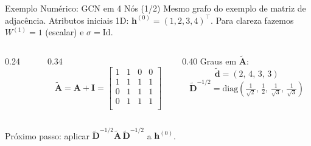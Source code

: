 \documentclass[aspectratio=169,xcolor=dvipsnames]{beamer}
\begin{document}
  \begin{frame}{Exemplo Numérico: GCN em 4 Nós (1/2)}
    Mesmo grafo do exemplo de matriz de adjacência. Atributos iniciais 1D: $\mathbf{h}^{(0)} = (1, 2, 3, 4)^\top$.
    Para clareza fazemos $W^{(1)} = 1$ (escalar) e $\sigma = \mathrm{Id}$.
    \begin{columns}[T]
      \begin{column}{0.24\textwidth}
        \centering
        \vspace{0.4em}
      \end{column}
      \begin{column}{0.34\textwidth}
        \[
          \tilde{\mathbf{A}} = \mathbf{A} + \mathbf{I} =
          \begin{bmatrix}
            1 & 1 & 0 & 0 \\
            1 & 1 & 1 & 1 \\
            0 & 1 & 1 & 1 \\
            0 & 1 & 1 & 1 \\
          \end{bmatrix}
        \]
      \end{column}
      \begin{column}{0.40\textwidth}
        Graus em $\tilde{\mathbf{A}}$:
        \[
          \tilde{\mathbf{d}} = (2,\, 4,\, 3,\, 3)
        \]
        \[
          \tilde{\mathbf{D}}^{-1/2} = \mathrm{diag}\!\left(
            \tfrac{1}{\sqrt 2},\, \tfrac{1}{2},\, \tfrac{1}{\sqrt 3},\, \tfrac{1}{\sqrt 3}
          \right)
        \]
      \end{column}
    \end{columns}
    \vspace{0.5em}
    Próximo passo: aplicar $\tilde{\mathbf{D}}^{-1/2} \tilde{\mathbf{A}}\, \tilde{\mathbf{D}}^{-1/2}$ a $\mathbf{h}^{(0)}$.
  \end{frame}
\end{document}
